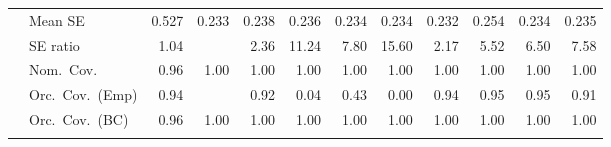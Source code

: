 \begin{landscape}
\begin{longtable}{llrrrrrrrrrr}
 & Mean SE & 0.527 & 0.233 & 0.238 & 0.236 & 0.234 & 0.234 & 0.232 & 0.254 & 0.234 & 0.235 \\
 & SE ratio & \cellcolor{rankone}1.04 &  & \cellcolor{rankthree}2.36 & 11.24 & 7.80 & 15.60 & \cellcolor{ranktwo}2.17 & 5.52 & 6.50 & 7.58 \\
 & Nom.\ Cov. & \cellcolor{rankone}0.96 & \cellcolor{ranktwo}1.00 & \cellcolor{ranktwo}1.00 & \cellcolor{ranktwo}1.00 & \cellcolor{ranktwo}1.00 & \cellcolor{ranktwo}1.00 & \cellcolor{ranktwo}1.00 & \cellcolor{ranktwo}1.00 & \cellcolor{ranktwo}1.00 & \cellcolor{ranktwo}1.00 \\
 & Orc.\ Cov.\ (Emp) & \cellcolor{ranktwo}0.94 &  & \cellcolor{rankthree}0.92 & 0.04 & 0.43 & 0.00 & \cellcolor{ranktwo}0.94 & \cellcolor{rankone}0.95 & \cellcolor{rankone}0.95 & 0.91 \\
 & Orc.\ Cov.\ (BC) & \cellcolor{rankone}0.96 & \cellcolor{ranktwo}1.00 & \cellcolor{ranktwo}1.00 & \cellcolor{ranktwo}1.00 & \cellcolor{ranktwo}1.00 & \cellcolor{ranktwo}1.00 & \cellcolor{ranktwo}1.00 & \cellcolor{ranktwo}1.00 & \cellcolor{ranktwo}1.00 & \cellcolor{ranktwo}1.00 \\
\addlinespace[2pt]
\end{longtable}
\end{landscape}

